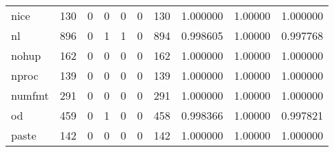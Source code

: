 \begin{tabular}{lrrrrrrrrr}
nice      &                    130 &                                  0 &                                 0 &                                0 &                                 0 &                             130 &                                1.000000 &                                1.00000 &                             1.000000 \\
nl        &                    896 &                                  0 &                                 1 &                                1 &                                 0 &                             894 &                                0.998605 &                                1.00000 &                             0.997768 \\
nohup     &                    162 &                                  0 &                                 0 &                                0 &                                 0 &                             162 &                                1.000000 &                                1.00000 &                             1.000000 \\
nproc     &                    139 &                                  0 &                                 0 &                                0 &                                 0 &                             139 &                                1.000000 &                                1.00000 &                             1.000000 \\
numfmt    &                    291 &                                  0 &                                 0 &                                0 &                                 0 &                             291 &                                1.000000 &                                1.00000 &                             1.000000 \\
od        &                    459 &                                  0 &                                 1 &                                0 &                                 0 &                             458 &                                0.998366 &                                1.00000 &                             0.997821 \\
paste     &                    142 &                                  0 &                                 0 &                                0 &                                 0 &                             142 &                                1.000000 &                                1.00000 &                             1.000000 \\

\end{tabular}
